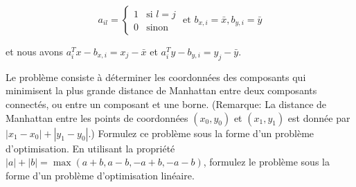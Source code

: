 \begin{enumerate}
\begin{itemize}
        $$a_{il}=
        \left\{
          \begin{array}{rll}
            1 & \mbox{si } l=j\\
            0 & \mbox{sinon}
          \end{array}
        \right.
        \mbox{ et }
        b_{x, i}=\bar x, b_{y,i}=\bar y
        $$

        et nous avons $a_i^Tx-b_{x,i}=x_j-\bar x$ et $a_i^Ty-b_{y,i}=y_j-\bar y.$

    \end{itemize}

    Le problème consiste à déterminer les coordonnées des composants qui minimisent
    la plus grande distance de Manhattan
    entre deux composants connectés, ou entre un composant et une borne. (Remarque: La distance de Manhattan entre les
    points de coordonnées
    $(x_0, y_0)$ et
    $(x_1, y_1)$ est donnée par
    $|x_1-x_0|+|y_1-y_0|$.) Formulez ce problème sous la forme d'un problème
    d'optimisation. En utilisant la propriété
    $|a|+|b|=\max(a+b, a-b, -a+b, -a-b)$, formulez le problème sous la
    forme d'un problème d'optimisation linéaire.

    \begin{solution}
      \nosolution
    \end{solution}

\end{enumerate}

